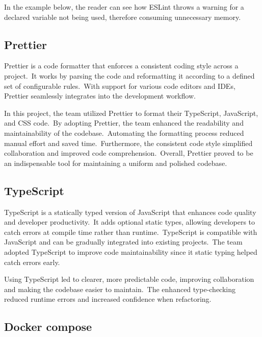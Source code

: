 In the example below, the reader can see how ESLint throws a warning for a declared variable not being used, therefore consuming unnecessary memory.



\subsection{Prettier}\label{subsec:prettier}

Prettier is a code formatter that enforces a consistent coding style across a project.\ It works by parsing the code and reformatting it according to a defined set of configurable rules.\ With support for various code editors and IDEs, Prettier seamlessly integrates into the development workflow.\cite[Prettier]{prettier}

In this project, the team utilized Prettier to format their TypeScript, JavaScript, and CSS code.\ By adopting Prettier, the team enhanced the readability and maintainability of the codebase.\ Automating the formatting process reduced manual effort and saved time.\ Furthermore, the consistent code style simplified collaboration and improved code comprehension.\ Overall, Prettier proved to be an indispensable tool for maintaining a uniform and polished codebase.

\subsection{TypeScript}\label{subsec:typescript}

TypeScript is a statically typed version of JavaScript that enhances code quality and developer productivity.\ It adds optional static types, allowing developers to catch errors at compile time rather than runtime.\ TypeScript is compatible with JavaScript and can be gradually integrated into existing projects.\ The team adopted TypeScript to improve code maintainability since it static typing helped catch errors early.\cite[TypeScript]{typescript}

Using TypeScript led to clearer, more predictable code, improving collaboration and making the codebase easier to maintain.\ The enhanced type-checking reduced runtime errors and increased confidence when refactoring.

\subsection{Docker compose}\label{subsec:docker-compose}

